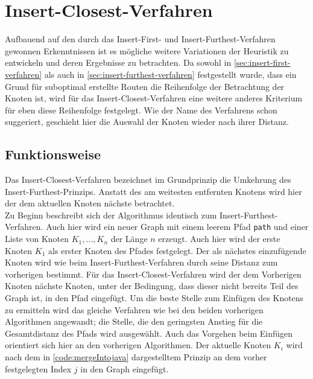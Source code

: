 \section{Insert-Closest-Verfahren}
Aufbauend auf den durch das Insert-First- und Insert-Furthest-Verfahren gewonnen Erkenntnissen ist es mögliche weitere Variationen der Heuristik zu entwickeln und deren Ergebnisse zu betrachten.
Da sowohl in \vref{sec:insert-first-verfahren} als auch in \vref{sec:insert-furthest-verfahren} festgestellt wurde, dass ein Grund für suboptimal erstellte Routen die Reihenfolge der Betrachtung der Knoten ist, wird für das Insert-Closest-Verfahren eine weitere anderes Kriterium für eben diese Reihenfolge festgelegt.
Wie der Name des Verfahrens schon suggeriert, geschieht hier die Auswahl der Knoten wieder nach ihrer Distanz.

\subsection{Funktionsweise}
Das Insert-Closest-Verfahren bezeichnet im Grundprinzip die Umkehrung des Insert-Furthest-Prinzips. 
Anstatt des am weitesten entfernten Knotens wird hier der dem aktuellen Knoten nächste betrachtet.
\\
Zu Beginn beschreibt sich der Algorithmus identisch zum Insert-Furthest-Verfahren.
Auch hier wird ein neuer Graph mit einem leerem Pfad \lstinline{path} und einer Liste von Knoten $K_1, \dots ,K_n$ der Länge $n$ erzeugt.
Auch hier wird der erste Knoten $K_1$ als erster Knoten des Pfades festgelegt.
Der als nächstes einzufügende Knoten wird wie beim Insert-Furthest-Verfahren durch seine Distanz zum vorherigen bestimmt.
Für das Insert-Closest-Verfahren wird der dem Vorherigen Knoten nächste Knoten, unter der Bedingung, dass dieser nicht bereits Teil des Graph ist, in den Pfad eingefügt.
Um die beste Stelle zum Einfügen des Knotens zu ermitteln wird das gleiche Verfahren wie bei den beiden vorherigen Algorithmen angewandt; die Stelle, die den geringsten Anstieg für die Gesamtdistanz des Pfads wird ausgewählt.
Auch das Vorgehen beim Einfügen orientiert sich hier an den vorherigen Algorithmen.
Der aktuelle Knoten $K_i$ wird nach dem in \vref{code:mergeIntojava} dargestelltem Prinzip an dem vorher festgelegten Index $j$ in den Graph eingefügt.

